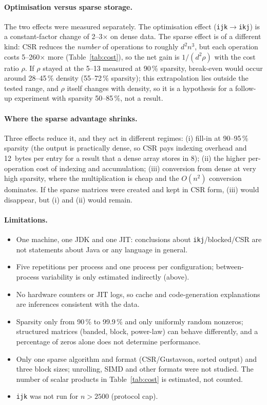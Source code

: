 \documentclass[11pt,a4paper]{article}
\begin{document}
\paragraph{Optimisation versus sparse storage.} The two effects were measured separately. The optimisation effect (\texttt{ijk}$\to$\texttt{ikj}) is a constant-factor change of 2--3$\times$ on dense data. The sparse effect is of a different kind: CSR reduces the \emph{number} of operations to roughly $d^2n^3$, but each operation costs 5--260$\times$ more (Table~\ref{tab:cost}), so the net gain is $1/(d^2\rho)$ with the cost ratio $\rho$. If $\rho$ stayed at the 5--13 measured at 90\,\% sparsity, break-even would occur around 28--45\,\% density (55--72\,\% sparsity); this extrapolation lies outside the tested range, and $\rho$ itself changes with density, so it is a hypothesis for a follow-up experiment with sparsity 50--85\,\%, not a result.
\paragraph{Where the sparse advantage shrinks.} Three effects reduce it, and they act in different regimes: (i) fill-in at 90--95\,\% sparsity (the output is practically dense, so CSR pays indexing overhead and 12~bytes per entry for a result that a dense array stores in 8); (ii) the higher per-operation cost of indexing and accumulation; (iii) conversion from dense at very high sparsity, where the multiplication is cheap and the $O(n^2)$ conversion dominates. If the sparse matrices were created and kept in CSR form, (iii) would disappear, but (i) and (ii) would remain.
\paragraph{Limitations.}
\begin{itemize}
\item One machine, one JDK and one JIT: conclusions about \texttt{ikj}/blocked/CSR are not statements about Java or any language in general.
\item Five repetitions per process and one process per configuration; between-process variability is only estimated indirectly (above).
\item No hardware counters or JIT logs, so cache and code-generation explanations are inferences consistent with the data.
\item Sparsity only from 90\,\% to 99.9\,\% and only uniformly random nonzeros; structured matrices (banded, block, power-law) can behave differently, and a percentage of zeros alone does not determine performance.
\item Only one sparse algorithm and format (CSR/Gustavson, sorted output) and three block sizes; unrolling, SIMD and other formats were not studied. The number of scalar products in Table~\ref{tab:cost} is estimated, not counted.
\item \texttt{ijk} was not run for $n>2500$ (protocol cap).
\end{itemize}
\end{document}
